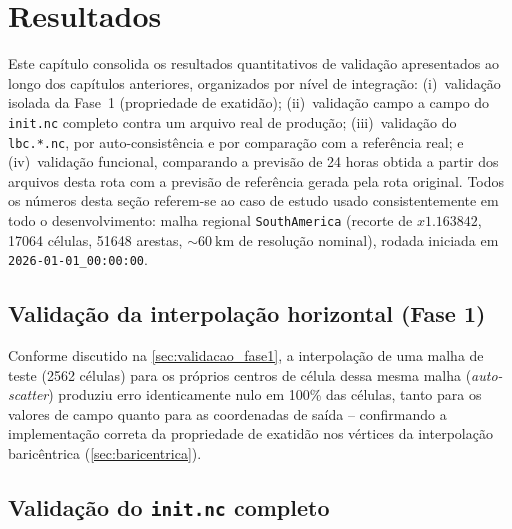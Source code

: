 \chapter{Resultados}
\label{cap:resultados}

Este capítulo consolida os resultados quantitativos de validação
apresentados ao longo dos capítulos anteriores, organizados por nível de
integração: (i)~validação isolada da Fase~1 (propriedade de exatidão);
(ii)~validação campo a campo do \texttt{init.nc} completo contra um
arquivo real de produção; (iii)~validação do \texttt{lbc.*.nc}, por
auto-consistência e por comparação com a referência real; e
(iv)~validação funcional, comparando a previsão de 24 horas obtida a
partir dos arquivos desta rota com a previsão de referência gerada pela
rota original. Todos os números desta seção referem-se ao caso de estudo
usado consistentemente em todo o desenvolvimento: malha regional
\texttt{SouthAmerica} (recorte de $x1.163842$, 17064 células, 51648
arestas, $\sim\SI{60}{\kilo\metre}$ de resolução nominal), rodada iniciada
em \texttt{2026-01-01\_00:00:00}.

\section{Validação da interpolação horizontal (Fase 1)}

Conforme discutido na \cref{sec:validacao_fase1}, a interpolação de uma
malha de teste (2562 células) para os próprios centros de célula dessa
mesma malha (\emph{auto-\emph{scatter}}) produziu erro identicamente nulo
em 100\% das células, tanto para os valores de campo quanto para as
coordenadas de saída -- confirmando a implementação correta da
propriedade de exatidão nos vértices da interpolação baricêntrica
(\cref{sec:baricentrica}).

\section{Validação do \texttt{init.nc} completo}

